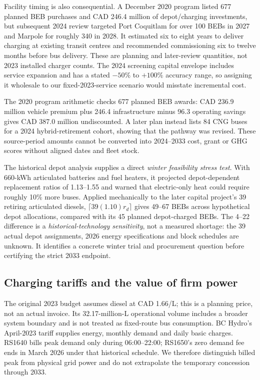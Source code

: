\documentclass[12pt,letterpaper]{article}
\begin{document}
Facility timing is also consequential. A December 2020 program listed 677 planned BEB purchases and CAD 246.4 million of depot/charging investments, but subsequent 2024 review targeted Port Coquitlam for over 100 BEBs in 2027 and Marpole for roughly 340 in 2028. It estimated six to eight years to deliver charging at existing transit centres and recommended commissioning six to twelve months before bus delivery. These are planning and later-review quantities, not 2023 installed charger counts. The 2024 screening capital envelope includes service expansion and has a stated $-50\%$ to $+100\%$ accuracy range, so assigning it wholesale to our fixed-2023-service scenario would misstate incremental cost.\cite{fleetupdate2020,playbook2024}

The 2020 program arithmetic checks 677 planned BEB awards: CAD 236.9 million vehicle premium plus 246.4 infrastructure minus 96.3 operating savings gives CAD 387.0 million undiscounted. A later plan instead lists 84 CNG buses for a 2024 hybrid-retirement cohort, showing that the pathway was revised. These source-period amounts cannot be converted into 2024--2033 cost, grant or GHG scores without aligned dates and fleet stock.\cite{fleetupdate2020,budget2025}

The historical depot analysis supplies a direct \emph{winter feasibility stress test}. With 660-kWh articulated batteries and fuel heaters, it projected depot-dependent replacement ratios of 1.13--1.55 and warned that electric-only heat could require roughly 10\% more buses. Applied mechanically to the later capital project's 39 retiring articulated diesels, $\lceil39(1.10)r_d\rceil$ gives 49--67 BEBs across hypothetical depot allocations, compared with its 45 planned depot-charged BEBs. The 4--22 difference is a \emph{historical-technology sensitivity}, not a measured shortage: the 39 actual depot assignments, 2026 energy specifications and block schedules are unknown. It identifies a concrete winter trial and procurement question before certifying the strict 2033 endpoint.\cite{fleet2020,budget2025}

\subsection{Charging tariffs and the value of firm power}
The original 2023 budget assumes diesel at CAD 1.66/L; this is a planning price, not an actual invoice. Its 32.17-million-L operational volume includes a broader system boundary and is not treated as fixed-route bus consumption.\cite{budget2023} BC Hydro's April-2023 tariff supplies energy, monthly demand and daily basic charges. RS1640 bills peak demand only during 06:00--22:00; RS1650's zero demand fee ends in March 2026 under that historical schedule. We therefore distinguish billed peak from physical grid power and do not extrapolate the temporary concession through 2033.\cite{bctariff2023}
\end{document}
